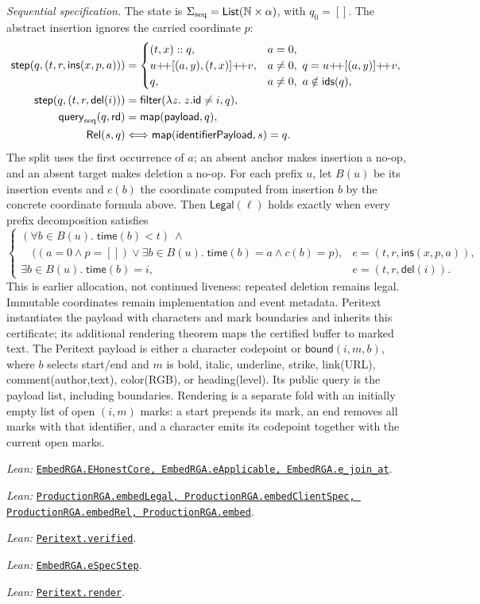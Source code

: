 \documentclass[11pt]{article}
\theoremstyle{definition}
\newcommand{\N}{\mathbb N}
\newcommand{\src}[2]{\href{../../#1}{\texttt{#2}}}
\newcommand{\anchor}[2]{\par\smallskip\noindent\emph{Lean: }\src{#1}{#2}.}
\begin{document}
\emph{Sequential specification.} The state is
$\Sigma_{\rm seq}=\mathsf{List}(\N\times\alpha)$, with $q_0=[]$.
The abstract insertion ignores the carried coordinate $p$:
\[
\begin{aligned}
 \mathsf{step}(q,(t,r,\mathsf{ins}(x,p,a)))
 &=\begin{cases}
 (t,x)::q,&a=0,\\
 u{+\!+}[(a,y),(t,x)]{+\!+}v,
   &a\ne0,\ q=u{+\!+}[(a,y)]{+\!+}v,\\
 q,&a\ne0,\ a\notin\mathsf{ids}(q),
 \end{cases}\\
 \mathsf{step}(q,(t,r,\mathsf{del}(i)))
 &=\mathsf{filter}(\lambda z.\;z.\mathsf{id}\ne i,q),\\
 \mathsf{query}_{\rm seq}(q,\mathsf{rd})&=\mathsf{map}(\mathsf{payload},q),\\
 \mathsf{Rel}(s,q)&\Longleftrightarrow
 \mathsf{map}(\mathsf{identifierPayload},s)=q.
\end{aligned}
\]
The split uses the first occurrence of $a$; an absent anchor makes insertion
a no-op, and an absent target makes deletion a no-op. For each prefix $u$,
let $B(u)$ be its insertion events and $c(b)$ the coordinate computed from
insertion $b$ by the concrete coordinate formula above. Then
$\mathsf{Legal}(\ell)$ holds exactly when every prefix decomposition satisfies
\[
\begin{cases}
 (\forall b\in B(u).\;\mathsf{time}(b)<t)\ \land\\
 \quad\bigl((a=0\land p=[])\lor
    \exists b\in B(u).\;\mathsf{time}(b)=a\land c(b)=p\bigr),
   & e=(t,r,\mathsf{ins}(x,p,a)),\\
 \exists b\in B(u).\;\mathsf{time}(b)=i,
   & e=(t,r,\mathsf{del}(i)).
\end{cases}
\]
This is earlier allocation, not continued liveness: repeated deletion remains
legal. Immutable coordinates remain implementation and event metadata. Peritext
instantiates the payload with characters and mark boundaries and inherits this
certificate; its additional rendering theorem maps the certified buffer to
marked text.
The Peritext payload is either a character codepoint or
$\mathsf{bound}(i,m,b)$, where $b$ selects start/end and $m$ is bold, italic,
underline, strike, link(URL), comment(author,text), color(RGB), or heading(level).
Its public query is the payload list, including boundaries. Rendering is a
separate fold with an initially empty list of open $(i,m)$ marks: a start
prepends its mark, an end removes all marks with that identifier, and a
character emits its codepoint together with the current open marks.
\anchor{Sal/MRDTs/Instances/EmbedRGA.lean}
  {EmbedRGA.EHonestCore, EmbedRGA.eApplicable, EmbedRGA.e\_join\_at}
\anchor{Sal/MRDTs/Instances/ProductionRGA.lean}
  {ProductionRGA.embedLegal, ProductionRGA.embedClientSpec, ProductionRGA.embedRel,
   ProductionRGA.embed}
\anchor{Sal/MRDTs/Instances/Peritext.lean}{Peritext.verified}
\anchor{Sal/MRDTs/Instances/EmbedRGASequential.lean}{EmbedRGA.eSpecStep}
\anchor{Sal/MRDTs/Instances/Peritext.lean}{Peritext.render}
\end{document}
